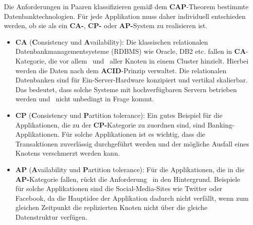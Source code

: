 Die Anforderungen in Paaren klassifizieren gemäß dem \textbf{CAP}-Theorem bestimmte Datenbanktechnologien. Für jede Applikation muss daher individuell entschieden werden, ob sie als ein \textbf{CA-}, \textbf{CP-} oder \textbf{AP-}System zu realisieren ist.
\begin{itemize}
\item \textbf{CA} (\textbf{C}onsistency und \textbf{A}vailability): Die klassischen relationalen Datenbankmanagementsysteme (RDBMS) wie Oracle, DB2 etc. fallen in \textbf{CA}-Kategorie, die vor allem \Cap\ und \cAp\ aller Knoten in einem Cluster hinzielt. Hierbei werden die Daten nach dem \textbf{ACID}-Prinzip verwaltet. Die relationalen Datenbanken sind für Ein-Server-Hardware konzipiert und vertikal skalierbar. Das bedeutet, dass solche Systeme mit hochverfügbaren Servern betrieben werden und \caP\  nicht unbedingt in Frage kommt.


\item \textbf{CP} (\textbf{C}onsistency und \textbf{P}artition tolerance): Ein gutes Beispiel für die Applikationen, die zu der \textbf{CP-}Kategorie zu zuordnen sind, sind Banking-Applikationen. Für solche Applikationen ist es wichtig, dass die Transaktionen zuverlässig durchgeführt werden und der mögliche Ausfall eines Knotens verschmerzt werden kann. 
%

\item \textbf{AP} (\textbf{A}vailability und \textbf{P}artition tolerance): Für die Applikationen, die in die \textbf{AP-}Kategorie fallen, rückt die Anforderung \Cap\ in den Hintergrund. Beispiele für solche Applikationen sind die Social-Media-Sites wie Twitter oder Facebook, da die Hauptidee der Applikation dadurch nicht verfällt, wenn zum gleichen Zeitpunkt die replizierten Knoten nicht über die gleiche Datenstruktur verfügen. 
\end{itemize}
